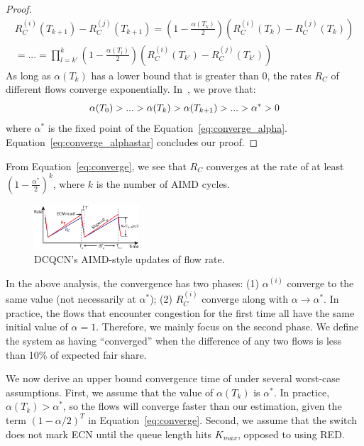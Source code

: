 \begin{proof}
\begin{equation}
\begin{array}{l}
R_C^{(i)}({T_{k + 1}}) - R_C^{(j)}({T_{k + 1}}) = \left( {1 - \frac{{\alpha ({T_k})}}{2}} \right)\left( {R_C^{(i)}({T_k}) - R_C^{(j)}({T_k})} \right)\\
 = ... = \prod\limits_{l = k'}^k {\left( {1 - \frac{{\alpha ({T_l})}}{2}} \right)} \left( {R_C^{(i)}({T_{k'}}) - R_C^{(j)}({T_{k'}})} \right)
\end{array}
\label{eq:converge}
\end{equation}
As long as $\alpha ({T_k})$ has a lower bound that is greater than 0, the rates $R_C$ of different flows 
converge exponentially. In~\cite{fullpaper}, we prove that:
\begin{equation}
\small
\alpha ({T_0}) > ... > \alpha ({T_k}) > \alpha ({T_{k + 1}}) > ... > {\alpha ^*} > 0
\label{eq:converge_alphastar}
\end{equation}
where $\alpha^{*}$ is the fixed point of the Equation~\ref{eq:converge_alpha}.
Equation~\ref{eq:converge_alphastar} concludes our proof. 
\end{proof}
From Equation~\ref{eq:converge}, we see that $R_C$ converges at the rate
of at least $( {1 - \frac{{{\alpha ^{*}}}}{2}} )^k$, where $k$ is the number of
AIMD cycles.

\begin{figure}[t]
\center
\includegraphics[width=0.35\textwidth]{figures/dcqcn_convergence_brief.eps}
\caption{DCQCN's AIMD-style updates of flow rate.}
\vspace{-1.5em}
\label{fig:dcqcn_convergence}
\end{figure}
\fi

In the above analysis, the convergence has two phases: (1) $\alpha ^{(i)}$
converge to the same value (not necessarily at $\alpha^*$); (2) $R_C^{(i)}$
converge along with $\alpha \to \alpha^*$.  In practice, the flows that
encounter congestion for the first time all have the same initial value of
$\alpha = 1$.  Therefore, we mainly focus on the second phase. We define the
system as having ``converged'' when the difference of any two flows is less than
10\% of expected fair share.

We now derive an upper bound convergence time of under several worst-case
assumptions. First, we assume that the value of $\alpha ({T_k})$ is $\alpha ^*$.
In practice, $\alpha ({T_k}) > \alpha ^*$, so the flows will converge faster
than our estimation, given the term $(1 - \alpha /2)^T$ in
Equation~\ref{eq:converge}.  Second, we assume that the switch does not mark ECN
until the queue length hits $K_{max}$, opposed to using RED. 

